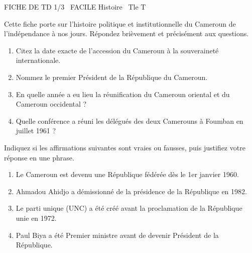\documentclass[11pt]{article}
\begin{document}
\begin{tcolorbox}[enhanced,colback=popink,colframe=popink,arc=10pt,boxrule=0pt,left=12pt,right=12pt,top=9pt,bottom=9pt]
{\color{white}\popxbold\small FICHE DE TD 1/3 \textbullet\ FACILE \hfill Histoire \textbullet\ Tle T\par}
\end{tcolorbox}
\vspace{4pt}
Cette fiche porte sur l'histoire politique et institutionnelle du Cameroun de l'indépendance à nos jours. Répondez brièvement et précisément aux questions.

\begin{exercice}
\begin{enumerate}
    \item Citez la date exacte de l'accession du Cameroun à la souveraineté internationale.
    \item Nommez le premier Président de la République du Cameroun.
    \item En quelle année a eu lieu la réunification du Cameroun oriental et du Cameroun occidental ?
    \item Quelle conférence a réuni les délégués des deux Camerouns à Foumban en juillet 1961 ?
\end{enumerate}
\end{exercice}

\begin{exercice}
Indiquez si les affirmations suivantes sont vraies ou fausses, puis justifiez votre réponse en une phrase.
\begin{enumerate}
    \item Le Cameroun est devenu une République fédérée dès le 1er janvier 1960.
    \item Ahmadou Ahidjo a démissionné de la présidence de la République en 1982.
    \item Le parti unique (UNC) a été créé avant la proclamation de la République unie en 1972.
    \item Paul Biya a été Premier ministre avant de devenir Président de la République.
\end{enumerate}
\end{exercice}
\end{document}
